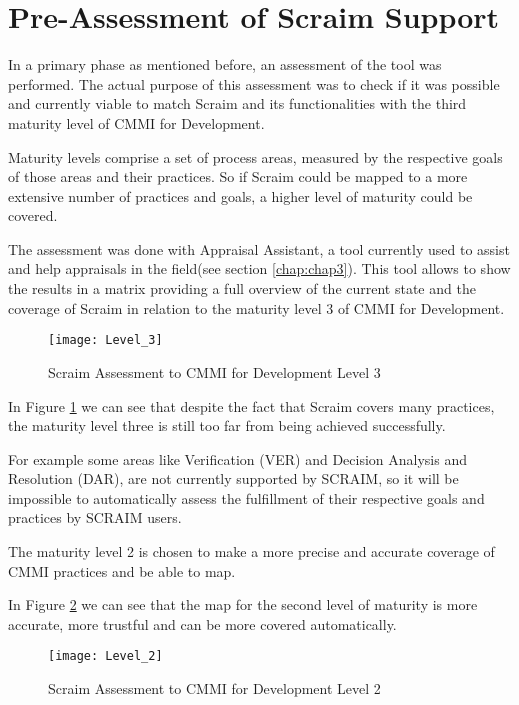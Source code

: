 \section{Pre-Assessment of Scraim Support} \label{sec:preassessment}

In a primary phase as mentioned before, an assessment of the tool was performed. The actual purpose of this assessment was to check if it was possible and currently viable to match Scraim and its functionalities with the third maturity level of CMMI for Development.

Maturity levels comprise a set of process areas, measured by the respective goals of those areas and their practices. So if Scraim could be mapped to a more extensive number of practices and goals, a higher level of maturity could be covered.

The assessment was done with Appraisal Assistant, a tool currently used to assist and help appraisals in the field(see section \ref{chap:chap3}). This tool allows to show the results in a matrix providing a full overview of the current state and the coverage of Scraim in relation to the maturity level 3 of CMMI for Development.


\begin{figure}[h]
	\begin{center}
		\leavevmode
		\texttt{[image: Level\_3]}
		\caption{Scraim Assessment to CMMI for Development Level 3}
		\label{fig:level3}
	\end{center}
\end{figure}

In Figure \ref{fig:level3} we can see that despite the fact that Scraim covers many practices, the maturity level three is still too far from being achieved successfully.

For example some areas like Verification (VER) and Decision Analysis and Resolution (DAR), are not currently supported by SCRAIM, so it will be impossible to automatically assess the fulfillment of their respective goals and practices by SCRAIM users.

The maturity level 2 is chosen to make a more precise and accurate coverage of CMMI practices and be able to map.

In Figure \ref{fig:level2} we can see that the map for the second level of maturity is more accurate, more trustful and can be more covered automatically.
	
\begin{figure}[h]
	\begin{center}
		\leavevmode
		\texttt{[image: Level\_2]}
		\caption{Scraim Assessment to CMMI for Development Level 2}
		\label{fig:level2}
	\end{center}
\end{figure}

